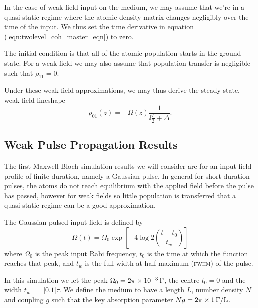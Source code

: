     In the case of weak field input on the medium, we may assume that we're in a
    quasi-static regime where the atomic density matrix changes negligibly over
    the time of the input. We thus set the time derivative in equation
    (\ref{eqn:twolevel_coh_master_eqn}) to zero.

    The initial condition is that all of the atomic population starts in the ground state. For a weak field we may also assume that population transfer is negligible such that $\rho_{11} = 0$.

    Under these weak field approximations, we may thus derive the steady state,
    weak field lineshape
    \begin{equation}\label{eqn:weak_lineshape}
      \rho_{01}(z) = -\Omega(z) \frac{1}{\ii \frac{\Gamma}{2} + \Delta}.
    \end{equation}

  \subsection{Weak Pulse Propagation Results}    

    The first Maxwell-Bloch simulation results we will consider are for an input
    field profile of finite duration, namely a Gaussian pulse. In general for
    short duration pulses, the atoms do not reach equilibrium with the applied
    field before the pulse has passed, however for weak fields so little
    population is transferred that a quasi-static regime can be a good
    approximation.

    The Gaussian pulsed input field is defined by
    \begin{equation}
      \Omega(t) = \Omega_{0} \exp \left[ -4 \log 2 \left( \frac{t - t_0}{t_w}
                              \right) \right]
      \label{eqn:gaussian}
    \end{equation}
    where $\Omega_{0}$ is the peak input Rabi frequency, $t_0$ is the time at
    which the function reaches that peak, and $t_w$ is the full width at half
    maximum (\textsc{fwhm}) of the pulse.

    In this simulation we let the peak $\Omega_0 =
    \unit[2\pi\times10^{-3}]{\Gamma}$, the centre $t_0 = 0$ and the width $t_w
    =$~\unit[$0.1$]{$\tau$}. We define the medium to have a length $L$, number
    density $N$ and coupling $g$ such that the key absorption parameter $Ng =
    \unit[2\pi\times1]{\Gamma /L}$.

